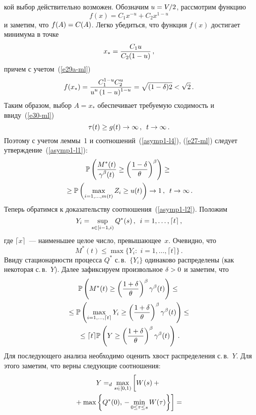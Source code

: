 \begin{multicols}{2}
\noindent
кой выбор  действительно возможен. Обозначим
$u\hm=V/2$, рассмотрим функцию
\begin{equation*}
f(x)=C_1 x^{-u}+C_2 x^{1-u} %
\end{equation*}
и заметим, что $f(A)\hm=C(A)$. Легко убедиться, что функция $f(x)$
достигает минимума в точке
$$
x_*=\displaystyle\frac{\displaystyle C_1 u\mathstrut}{\displaystyle C_2(1-u)\mathstrut}\,,
$$
причем с учетом~(\ref{e29a-ml})
$$
f(x_*)=\displaystyle\frac{\displaystyle C_1^{1-u}C_2^u\mathstrut}{\displaystyle u^u\,(1-u)^{1-u}\mathstrut}=\sqrt{(1-\delta)2}<\sqrt{2}\,.
$$
Таким образом, выбор $A=x_*$ обеспечивает требуемую сходимость и
 ввиду~(\ref{e30-ml})
$$
\tau(t)\ge g(t) \to \infty\,,\enskip t \to \infty\,.
$$
Поэтому с учетом леммы~1 и соотношений~(\ref{asymp1-l4}), (\ref{e27-ml}) следует 
утверждение~(\ref{asymp1-l1}):
\begin{multline*}
\mathbb{P}\left(\displaystyle\frac{\displaystyle M^*(t)\mathstrut}{\displaystyle \gamma^\beta(t)\mathstrut} \geq
 \left(
\displaystyle\frac{\displaystyle 1-\delta\mathstrut}{\displaystyle \theta\mathstrut} \right)^\beta \right)\geq{}\\
{}\geq \mathbb{P}\left(
\max\limits_{i=1,\ldots,m(t)}Z_i \geq u(t) \right) \to 1\,,\enskip t \to \infty\,.
\end{multline*}
Теперь обратимся к доказательству соотношения~(\ref{asymp1-l2}).
Положим
$$
Y_i=\sup\limits_{s \in [i-1,i)} Q^*(s)\,,\enskip i=1,\ldots,\lceil t \rceil\,,
$$
где $\lceil x \rceil$~--- наименьшее целое число, превы\-ша\-ющее~$x$.
Очевидно, что
$$
M^*(t) \leq \max\{Y_i:\,\,i=1,\ldots,\lceil t \rceil\}\,.
$$
Ввиду  стационарности  процесса $Q^*$ с.\,в.\ $\{Y_i\}$ одинаково
распределены (как некоторая с.\,в.~$Y$).  Далее зафиксируем
произвольное $\delta\hm>0$ и заметим, что
\begin{multline}
\mathbb{P} \left( M^*(t) \geq \left(\displaystyle\frac{\displaystyle 1+\delta\mathstrut}{\displaystyle \theta\mathstrut}\right)^\beta
\gamma^\beta(t) \right) \leq{}\\
{}\leq \mathbb{P} \left( \max_{i=1,\ldots,\lceil t \rceil} Y_i \geq 
\left(\displaystyle\frac{\displaystyle 1+\delta\mathstrut}{\displaystyle \theta\mathstrut}\right)^\beta
\gamma^\beta(t)  \right)\leq{}\\
{}\leq \lceil t \rceil \mathbb{P} \left(Y \geq \left(\displaystyle\frac{\displaystyle 1+\delta\mathstrut}{\displaystyle \theta\mathstrut}\right)^\beta 
\gamma^\beta(t) \right)\,. 
\label{asymp1-l6}
\end{multline}
Для последующего анализа необходимо оценить хвост распределения
с.\,в.~$Y$. Для этого заметим, что верны следующие соотношения:
\begin{multline*}
Y =_d\max\limits_{s \in [0,1)} \left[ \vphantom{\max\limits_{s \in [0,1)}}
W(s)+{}\right.\\
\left.{}+\max\left\{Q^*(0),\,
-\min\limits_{0 \leq \tau \leq s}W(\tau)   \right\}\right]={}
\end{multline*}


\end{multicols}
